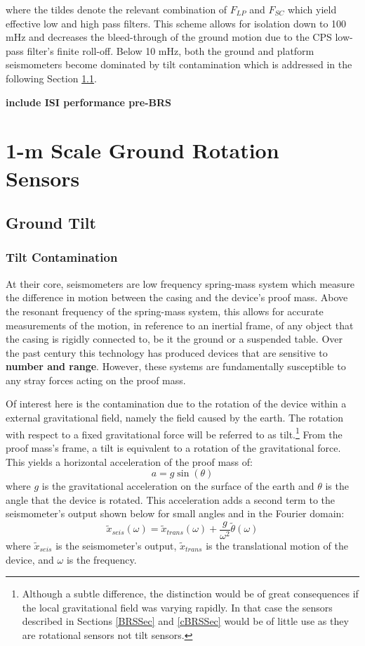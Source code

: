\documentclass [12pt, proquest]{uwthesis}[2019]
\begin{document}
where the tildes denote the relevant combination of $F_{LP}$ and $F_{SC}$ which yield effective low and high pass filters. This scheme allows for isolation down to 100 mHz and decreases the bleed-through of the  ground motion due to the CPS low-pass filter's finite roll-off. Below 10 mHz, both the ground and platform seismometers become dominated by tilt contamination which is addressed in the following Section \ref{tilt}.

\textbf{include ISI performance pre-BRS}

\chapter{1-m Scale Ground Rotation Sensors} \label{BRS_chap}
\section{Ground Tilt}\label{tilt}
\subsection{Tilt Contamination}\label{tiltCon}
\quad At their core, seismometers are low frequency spring-mass system which measure the difference in motion between the casing and the device's proof mass. Above the resonant frequency of the spring-mass system, this allows for accurate measurements of the motion, in reference to an inertial frame, of any object that the casing is rigidly connected to, be it the ground or a suspended table. Over the past century this technology has produced devices that are sensitive to \textbf{number and range}. However, these systems are fundamentally susceptible to any stray forces acting on the proof mass.

Of interest here is the contamination due to the rotation of the device within a external gravitational field, namely the field caused by the earth. The rotation with respect to a fixed gravitational force will be referred to as tilt.\footnote{Although a subtle difference, the distinction would be of great consequences if the local gravitational field was varying rapidly. In that case the sensors described in Sections \ref{BRSSec} and \ref{cBRSSec} would be of little use as they are rotational sensors not tilt sensors.} From the proof mass's frame, a tilt is equivalent to a rotation of the gravitational force. This yields a horizontal acceleration of the proof mass of:
\[ a=g \sin(\theta)\]
where $g$ is the gravitational acceleration on the surface of the earth and $\theta$ is the angle that the device is rotated. This acceleration adds a second term to the seismometer's output shown below for small angles and in the Fourier domain:
\[\tilde{x}_{seis}(\omega)=\tilde{x}_{trans}(\omega)+\frac{g}{\omega^2}\tilde{\theta}(\omega)\]
where $\tilde{x}_{seis}$ is the seismometer's output, $\tilde{x}_{trans}$ is the translational motion of the device, and $\omega$ is the frequency. 
\end{document}
